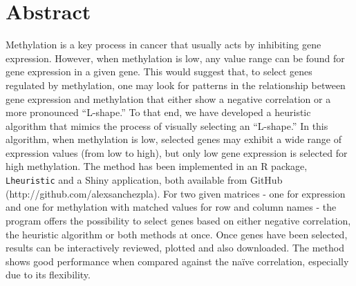 \documentclass[10pt,letterpaper]{article}
\newcommand{\getIndex}[2]{
  \ForEach{,}{\IfEq{#1}{\thislevelitem}{\number\thislevelcount\ExitForEach}{}}{#2}
}
\newcommand{\getAff}[1]{
  \getIndex{#1}{Universitat de Barcelona (UB),Vall d'Hebron Research
Institute (VHIR)}
}
\begin{document}
\vspace*{0.2in}

\section*{Abstract}
Methylation is a key process in cancer that usually acts by inhibiting
gene expression. However, when methylation is low, any value range can
be found for gene expression in a given gene. This would suggest that,
to select genes regulated by methylation, one may look for patterns in
the relationship between gene expression and methylation that either
show a negative correlation or a more pronounced ``L-shape.'' To that
end, we have developed a heuristic algorithm that mimics the process of
visually selecting an ``L-shape.'' In this algorithm, when methylation
is low, selected genes may exhibit a wide range of expression values
(from low to high), but only low gene expression is selected for high
methylation. The method has been implemented in an R package,
\texttt{Lheuristic} and a Shiny application, both available from GitHub
(http://github.com/alexsanchezpla). For two given matrices - one for
expression and one for methylation with matched values for row and
column names - the program offers the possibility to select genes based
on either negative correlation, the heuristic algorithm or both methods
at once. Once genes have been selected, results can be interactively
reviewed, plotted and also downloaded. The method shows good performance
when compared against the naïve correlation, especially due to its
flexibility.
\end{document}
